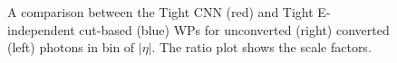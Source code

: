 \begin{figure}[htbp]
    \centering
	\begin{tcolorbox}[colback=black!5!white,colframe=white!75!black]
    \caption{A comparison between the Tight CNN (red) and Tight E-independent cut-based  (blue) WPs for unconverted (right) converted (left) photons in bin of $|\eta|$. The ratio plot shows the scale factors.}
    \label{Eff:Tight:Inc}
    \end{tcolorbox}
    
\end{figure}

